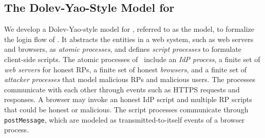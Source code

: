 

\subsection{The Dolev-Yao-Style Model for \usso}
\label{dy-model}

We develop a Dolev-Yao-style model \cite{SPRESSO} for \usso, referred to as the \dyu{ }model, to formalize the login flow of \usso. %
It abstracts the entities in a web system, such as web servers and browsers, as \emph{atomic processes}, %
and defines \emph{script processes} to formulate client-side scripts.
The atomic processes of \usso~include an {\em IdP process}, a finite set of {\em web servers} for honest RPs, a finite set of honest {\em browsers}, and a finite set of {\em attacker processes} that model malicious RPs and malicious users.
The processes communicate with each other through events such as HTTPS requests and responses. A browser may invoke an honest IdP script and multiple RP scripts that could be honest or malicious.
The script processes communicate through \verb+postMessage+, which are modeled as transmitted-to-itself events of a browser process.

